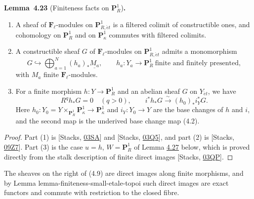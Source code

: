 \documentclass[11pt]{article}
\newenvironment{bpstatement}[2]{\par\addvspace{0.6\baselineskip}\noindent\textbf{#1}#2\textbf{.}\enspace\ignorespaces}
  {\par\addvspace{0.4\baselineskip}}
\newenvironment{bpstatementit}[2]{\begin{bpstatement}{#1}{#2}\itshape\ignorespaces}{\end{bpstatement}}
\begin{document}
\label{bp349}%
\begin{bpstatementit}{Lemma~4.23}{ (Finiteness facts on $\mathbf P^1_R$)}
\begin{enumerate}
\item A sheaf of \(\mathbf F_\ell\)-modules on \(\mathbf P^1_{R,\acute{e}t}\) is a filtered colimit of constructible ones, and cohomology on \(\mathbf P^1_R\) and on \(\mathbf P^1_\kappa\) commutes with filtered colimits.
\item A constructible sheaf \(G\) of \(\mathbf F_\ell\)-modules on \(\mathbf P^1_{R,\acute{e}t}\) admits a monomorphism \[
   G\hookrightarrow
   \bigoplus_{a=1}^N(h_a)_*\underline{M_a},
   \qquad h_a:Y_a\to \mathbf P^1_R\ \text{finite and finitely presented},
   \tag{4.9}
   \] with \(M_a\) finite \(\mathbf F_\ell\)-modules.
\item For a finite morphism \(h:Y\to \mathbf P^1_R\) and an abelian sheaf \(G\) on \(Y_{\acute{e}t}\), we have \[
   R^qh_*G=0\quad(q>0),\qquad
   i^*h_*G\xrightarrow{\sim}(h_0)_*i_Y^*G.
   \tag{4.10}
   \] Here \(h_0:Y_0=Y\times_{\mathbf P^1_R}\mathbf P^1_\kappa\to \mathbf P^1_\kappa\) and \(i_Y:Y_0\to Y\) are the base changes of \(h\) and \(i\), and the second map is the underived base change map (4.2).
\end{enumerate}
\end{bpstatementit}

\begin{proof}[{Proof}]\label{bp350}%
Part (1) is [Stacks, \href{https://stacks.math.columbia.edu/tag/03SA}{03SA}] and [Stacks, \href{https://stacks.math.columbia.edu/tag/03Q5}{03Q5}], and part (2) is [Stacks, \href{https://stacks.math.columbia.edu/tag/09Z7}{09Z7}]. Part (3) is the case \(u=h\), \(W=\mathbf P^1_R\) of Lemma \hyperref[bp364]{4.27} below, which is proved directly from the stalk description of finite direct images [Stacks, \href{https://stacks.math.columbia.edu/tag/03QP}{03QP}].
\end{proof}

\label{bp351}%
The sheaves on the right of (4.9) are direct images along finite morphisms, and by Lemma lemma-finiteness-small-etale-topoi such direct images are exact functors and commute with restriction to the closed fibre.
\end{document}
